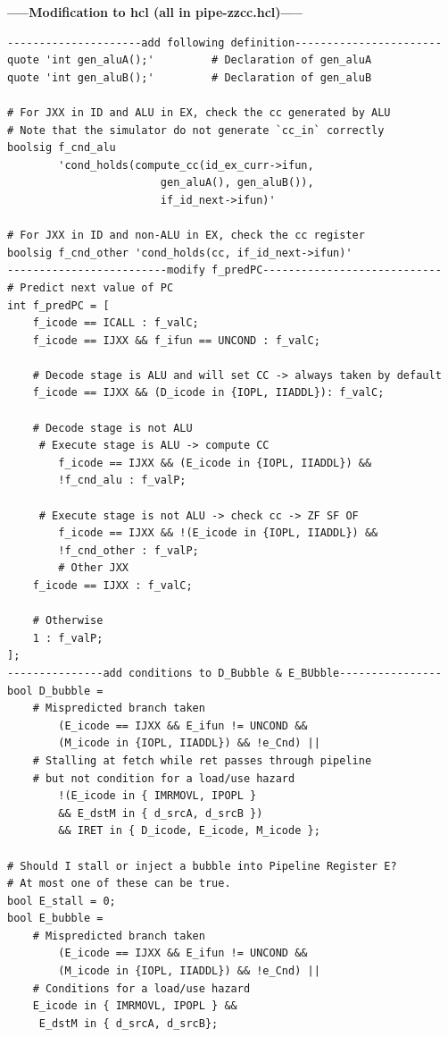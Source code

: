 \documentclass{article}
\begin{document}
\begin{center}
        \textbf{-----Modification to hcl (all in pipe-zzcc.hcl)-----}\\
\end{center}
\begin{lstlisting} 
---------------------add following definition-----------------------
quote 'int gen_aluA();'			# Declaration of gen_aluA
quote 'int gen_aluB();'			# Declaration of gen_aluB

# For JXX in ID and ALU in EX, check the cc generated by ALU
# Note that the simulator do not generate `cc_in` correctly
boolsig f_cnd_alu 
        'cond_holds(compute_cc(id_ex_curr->ifun, 
                        gen_aluA(), gen_aluB()), 
                        if_id_next->ifun)'

# For JXX in ID and non-ALU in EX, check the cc register
boolsig f_cnd_other 'cond_holds(cc, if_id_next->ifun)'
-------------------------modify f_predPC----------------------------
# Predict next value of PC
int f_predPC = [
	f_icode == ICALL : f_valC;
	f_icode == IJXX && f_ifun == UNCOND : f_valC;

	# Decode stage is ALU and will set CC -> always taken by default
	f_icode == IJXX && (D_icode in {IOPL, IIADDL}): f_valC;

	# Decode stage is not ALU
	 # Execute stage is ALU -> compute CC
        f_icode == IJXX && (E_icode in {IOPL, IIADDL}) && 
        !f_cnd_alu : f_valP;

	 # Execute stage is not ALU -> check cc -> ZF SF OF
        f_icode == IJXX && !(E_icode in {IOPL, IIADDL}) && 
        !f_cnd_other : f_valP;
        # Other JXX
	f_icode == IJXX : f_valC;

	# Otherwise
	1 : f_valP;
];
---------------add conditions to D_Bubble & E_BUbble----------------
bool D_bubble =
	# Mispredicted branch taken
        (E_icode == IJXX && E_ifun != UNCOND && 
        (M_icode in {IOPL, IIADDL}) && !e_Cnd) ||
	# Stalling at fetch while ret passes through pipeline
	# but not condition for a load/use hazard
        !(E_icode in { IMRMOVL, IPOPL } 
        && E_dstM in { d_srcA, d_srcB }) 
        && IRET in { D_icode, E_icode, M_icode };

# Should I stall or inject a bubble into Pipeline Register E?
# At most one of these can be true.
bool E_stall = 0;
bool E_bubble =
	# Mispredicted branch taken
        (E_icode == IJXX && E_ifun != UNCOND && 
        (M_icode in {IOPL, IIADDL}) && !e_Cnd) ||
	# Conditions for a load/use hazard
	E_icode in { IMRMOVL, IPOPL } &&
	 E_dstM in { d_srcA, d_srcB};
\end{lstlisting}
\end{document}

